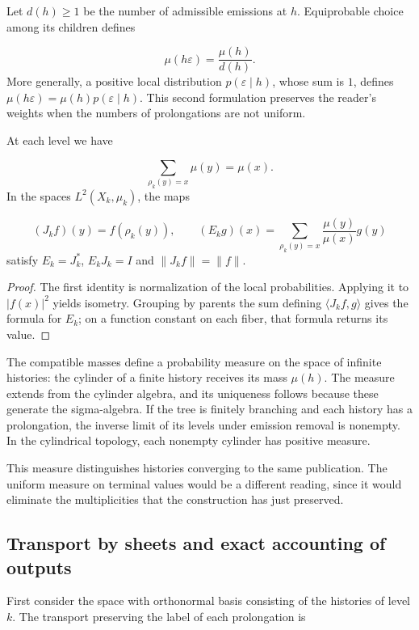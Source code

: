 Let \(d(h)\geq1\) be the number of admissible emissions at \(h\). Equiprobable choice among its children defines

\[
\mu(h\varepsilon)=\frac{\mu(h)}{d(h)}.
\]
More generally, a positive local distribution \(p(\varepsilon\mid h)\), whose sum is \(1\), defines \(\mu(h\varepsilon)=\mu(h)p(\varepsilon\mid h)\). This second formulation preserves the reader's weights when the numbers of prolongations are not uniform.

\begin{proposition}
\label{x_reciprocidad:iv:cont:esperanza}
At each level we have

\[
\sum_{\rho_k(y)=x}\mu(y)=\mu(x).
\]
In the spaces \(L^2(X_k,\mu_k)\), the maps

\[
(J_kf)(y)=f(\rho_k(y)),
\qquad
(E_kg)(x)=\sum_{\rho_k(y)=x}\frac{\mu(y)}{\mu(x)}g(y)
\]
satisfy \(E_k=J_k^*\), \(E_kJ_k=I\) and \(\|J_kf\|=\|f\|\).

\end{proposition}
\begin{proof}
The first identity is normalization of the local probabilities. Applying it to \(|f(x)|^2\) yields isometry. Grouping by parents the sum defining \(\langle J_kf,g\rangle\) gives the formula for \(E_k\); on a function constant on each fiber, that formula returns its value.
\end{proof}

The compatible masses define a probability measure on the space of infinite histories: the cylinder of a finite history receives its mass \(\mu(h)\). The measure extends from the cylinder algebra, and its uniqueness follows because these generate the sigma-algebra. If the tree is finitely branching and each history has a prolongation, the inverse limit of its levels under emission removal is nonempty. In the cylindrical topology, each nonempty cylinder has positive measure.

This measure distinguishes histories converging to the same publication. The uniform measure on terminal values would be a different reading, since it would eliminate the multiplicities that the construction has just preserved.

\subsection{Transport by sheets and exact accounting of outputs}
\label{x_reciprocidad:iv:cont:transporte}
First consider the space with orthonormal basis consisting of the histories of level \(k\). The transport preserving the label of each prolongation is

